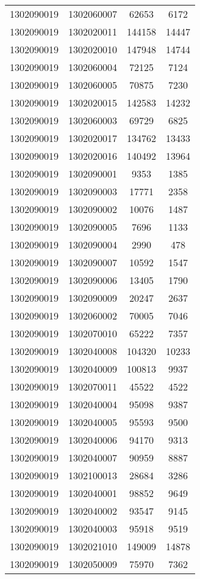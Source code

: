 \begin{longtable}[h]{llcc}
		1302090019 & 1302060007 & 62653 & 6172\\
		1302090019 & 1302020011 & 144158 & 14447\\
		1302090019 & 1302020010 & 147948 & 14744\\
		1302090019 & 1302060004 & 72125 & 7124\\
		1302090019 & 1302060005 & 70875 & 7230\\
		1302090019 & 1302020015 & 142583 & 14232\\
		1302090019 & 1302060003 & 69729 & 6825\\
		1302090019 & 1302020017 & 134762 & 13433\\
		1302090019 & 1302020016 & 140492 & 13964\\
		1302090019 & 1302090001 & 9353 & 1385\\
		1302090019 & 1302090003 & 17771 & 2358\\
		1302090019 & 1302090002 & 10076 & 1487\\
		1302090019 & 1302090005 & 7696 & 1133\\
		1302090019 & 1302090004 & 2990 & 478\\
		1302090019 & 1302090007 & 10592 & 1547\\
		1302090019 & 1302090006 & 13405 & 1790\\
		1302090019 & 1302090009 & 20247 & 2637\\
		1302090019 & 1302060002 & 70005 & 7046\\
		1302090019 & 1302070010 & 65222 & 7357\\
		1302090019 & 1302040008 & 104320 & 10233\\
		1302090019 & 1302040009 & 100813 & 9937\\
		1302090019 & 1302070011 & 45522 & 4522\\
		1302090019 & 1302040004 & 95098 & 9387\\
		1302090019 & 1302040005 & 95593 & 9500\\
		1302090019 & 1302040006 & 94170 & 9313\\
		1302090019 & 1302040007 & 90959 & 8887\\
		1302090019 & 1302100013 & 28684 & 3286\\
		1302090019 & 1302040001 & 98852 & 9649\\
		1302090019 & 1302040002 & 93547 & 9145\\
		1302090019 & 1302040003 & 95918 & 9519\\
		1302090019 & 1302021010 & 149009 & 14878\\
		1302090019 & 1302050009 & 75970 & 7362\\

\end{longtable}
